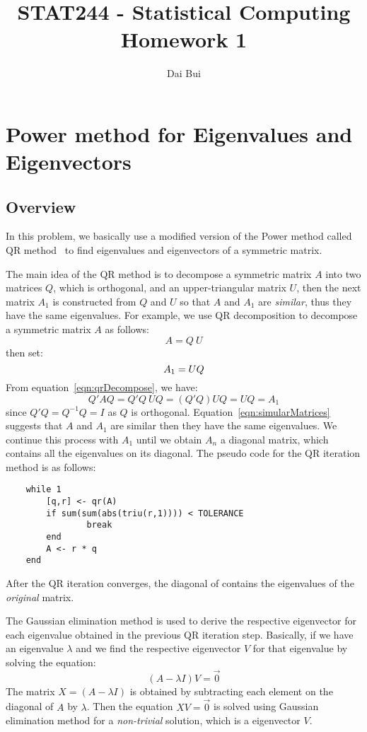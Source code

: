 \documentclass{article}
\title{STAT244 - Statistical Computing\\ Homework 1}
\author{Dai Bui}
\begin{document}
\date{}
\maketitle
\section{Power method for Eigenvalues and Eigenvectors}
\subsection{Overview}
    In this problem, we basically use a modified version of the Power
    method called QR method~\cite{PressNumericalRecipes,
    MathewsNumericalMethodMatlab} to find eigenvalues and eigenvectors of a
    symmetric matrix.
    
    The main idea of the QR method is to decompose a symmetric matrix $A$ into
    two matrices $Q$, which is orthogonal, and an upper-triangular matrix $U$,
    then the next matrix $A_1$ is constructed from $Q$ and $U$ so that $A$ and
    $A_1$ are \textit{similar}, thus they have the same eigenvalues. For
    example, we use QR decomposition to decompose a symmetric matrix $A$ as
    follows:
    \begin{equation}\label{eqn:qrDecompose}
    A=Q\ U	
    \end{equation}
	then set: 
	\begin{equation}
    A_1=UQ	\notag
    \end{equation}
	From equation~\ref{eqn:qrDecompose}, we have:
	\begin{equation}\label{eqn:simularMatrices}
    Q'AQ=Q'Q\ UQ=(Q'Q)UQ=UQ=A_1
    \end{equation}
	since $Q'Q=Q^{-1}Q=I$ as $Q$ is orthogonal.
	Equation~\ref{eqn:simularMatrices} suggests that $A$ and $A_1$ are similar then
	they have the same eigenvalues. We continue this process with $A_1$ until we
	obtain $A_n$ a diagonal matrix, which contains all the eigenvalues on its
	diagonal. The pseudo code for the QR iteration method is as follows:
	
	\begin{lstlisting}
    while 1
  		[q,r] <- qr(A)
  		if sum(sum(abs(triu(r,1)))) < TOLERANCE
     			break
  		end
  		A <- r * q
	end
	\end{lstlisting}
	After the QR iteration converges, the diagonal of contains the eigenvalues of
	the \textit{original} matrix. 
	
	The Gaussian elimination method is used to derive the respective eigenvector
	for each eigenvalue obtained in the previous QR iteration step. Basically, if
	we have an eigenvalue $\lambda$ and we find the respective eigenvector $V$
	for that eigenvalue by solving the equation:
	\begin{equation}\label{eqn:eigenVector}
    (A-\lambda I)V=\vec{0}
    \end{equation}
	The matrix $X=(A-\lambda I)$ is obtained by subtracting each element on the
	diagonal of $A$ by $\lambda$. Then the equation $XV=\vec{0}$ is solved using
	Gaussian elimination method for a \textit{non-trivial} solution, which is a
	eigenvector $V$.
	
\end{document}
